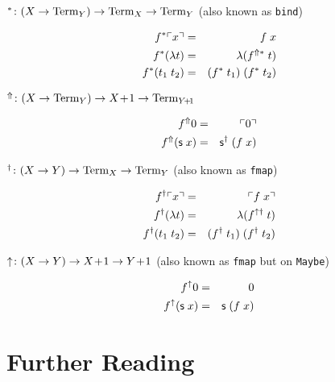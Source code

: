 $^* \colon (X \to \mathrm{Term}_{Y}) \to \mathrm{Term}_{X} \to \mathrm{Term}_{Y}$ (also known as \texttt{bind})

\begin{eqnarray*}
  f^*\ulcorner x \urcorner   & = & f\;x \\
  f^*(\lambda t) & = & \lambda (f^{\Uparrow*} \; t) \\
  f^*(t_1\;t_2)  & = & (f^* \; t_1) \; (f^* \; t_2)
\end{eqnarray*}

$^\Uparrow \colon (X \to \mathrm{Term}_{Y}) \to X\!+\!1 \to \mathrm{Term}_{Y\!+\!1}$

\begin{eqnarray*}
  f^\Uparrow 0 & = & \ulcorner 0 \urcorner \\
  f^\Uparrow (\mathsf{s} \; x) & = & \mathsf{s}^\dagger\;(f\;x) \\
\end{eqnarray*}

$^\dagger \colon (X \to Y) \to \mathrm{Term}_{X} \to \mathrm{Term}_{Y}$ (also known as \texttt{fmap})

\begin{eqnarray*}
  f^\dagger\ulcorner x \urcorner   & = & \ulcorner f\;x \urcorner \\
  f^\dagger(\lambda t) & = & \lambda(f^{\uparrow\dagger}\;t) \\
  f^\dagger(t_1\;t_2)  & = & (f^\dagger\;t_1)\;(f^\dagger\;t_2)
\end{eqnarray*}

$\uparrow \colon (X \to Y) \to X\!+\!1 \to Y\!+\!1$
  (also known as \texttt{fmap} but on \texttt{Maybe})

\begin{eqnarray*}
  f^\uparrow 0            & = & 0 \\
  f^\uparrow (\mathsf{s}\;x) & = & \mathsf{s}\;(f \; x)
\end{eqnarray*}

\section{Further Reading}
